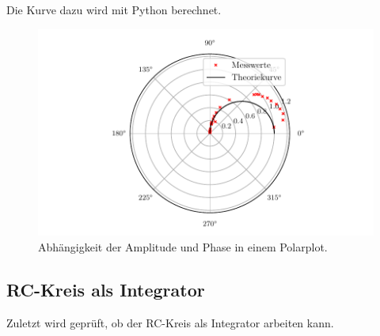 \noindent Die Kurve dazu wird mit Python berechnet.
\begin{figure}[H]
  \centering
  \includegraphics{plot4.pdf}
  \caption{Abhängigkeit der Amplitude und Phase in einem Polarplot.}
  \label{fig:plot}
\end{figure}

\subsection{RC-Kreis als Integrator}
\noindent Zuletzt wird geprüft, ob der RC-Kreis als Integrator arbeiten kann.

